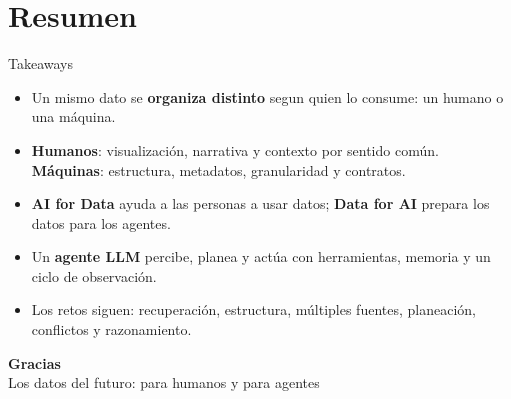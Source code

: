 \documentclass[aspectratio=169]{beamer}
\begin{document}
\section{Resumen}

\begin{frame}{Takeaways}
  \begin{itemize}
    \item Un mismo dato se \textbf{organiza distinto} segun quien lo consume:
          un humano o una m\'aquina.
    \item \textbf{Humanos}: visualizaci\'on, narrativa y contexto por sentido
          com\'un. \textbf{M\'aquinas}: estructura, metadatos, granularidad y
          contratos.
    \item \textbf{AI for Data} ayuda a las personas a usar datos; \textbf{Data
          for AI} prepara los datos para los agentes.
    \item Un \textbf{agente LLM} percibe, planea y act\'ua con herramientas,
          memoria y un ciclo de observaci\'on.
    \item Los retos siguen: recuperaci\'on, estructura, m\'ultiples fuentes,
          planeaci\'on, conflictos y razonamiento.
  \end{itemize}
\end{frame}

\begin{frame}[plain]
  \molinaBanner
  \vfill
  \begin{center}
    {\color{molMorado}\Large\bfseries Gracias}\\[0.4em]
    {\color{molTeal} Los datos del futuro: para humanos y para agentes}
  \end{center}
  \vfill\vspace{1.0cm}
  \molinaLogos
\end{frame}
\end{document}
